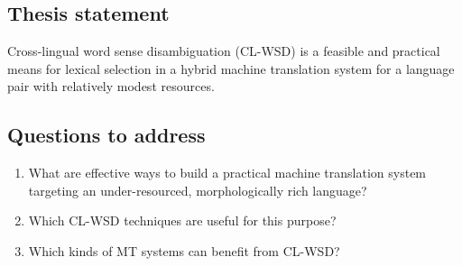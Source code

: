 \subsection{Thesis statement}
Cross-lingual word sense disambiguation (CL-WSD) is a feasible and practical
means for lexical selection in a hybrid machine translation system for a
language pair with relatively modest resources.

\subsection{Questions to address}
\begin{enumerate}
\item What are effective ways to build a practical machine translation system
targeting an under-resourced, morphologically rich language?
\item Which CL-WSD techniques are useful for this purpose?
\item Which kinds of MT systems can benefit from CL-WSD?
\end{enumerate}
